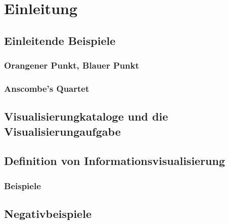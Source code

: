 
\chapter{Einleitung} %

    \section{Einleitende Beispiele} %

        \subsection{Orangener Punkt, Blauer Punkt} %

        \subsection{Anscombe's Quartet} %

    \section{Visualisierungkataloge und die Visualisierungaufgabe} %

    \section{Definition von Informationsvisualisierung} %

        \subsection{Beispiele} %

    \section{Negativbeispiele} %

